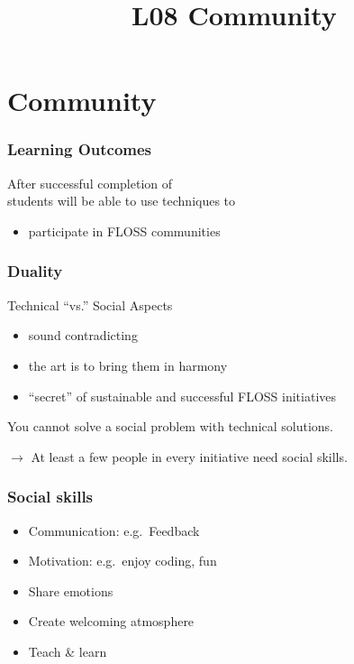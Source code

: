 

\title{L08 Community}




\section{Community}


\begin{frame}
	\frametitle{Learning Outcomes}
	After successful completion of \inserttitle \\
	students will be able to
	use techniques to

	\begin{itemize}
	\item participate in FLOSS communities
	\end{itemize}
\end{frame}

\begin{frame}
	\frametitle{Duality}
	Technical ``vs.'' Social Aspects

	\begin{itemize}[<+-| alert@+>]
		\item sound contradicting
		\item the art is to bring them in harmony
		\item ``secret'' of sustainable and successful FLOSS initiatives
	\end{itemize}
	\vspace{1em}
	\pause[\thebeamerpauses]  %

	You cannot solve a social problem with technical solutions.
	\vspace{1em}
	\pause

	$\rightarrow$ At least a few people in every initiative need social skills.
\end{frame}

\begin{frame}
	\frametitle{Social skills}

	\begin{itemize}[<+-| alert@+>]
		\item Communication: e.g.\ Feedback
		\item Motivation: e.g.\ enjoy coding, fun
		\item Share emotions
		\item Create welcoming atmosphere
		\item Teach \& learn
	\end{itemize}
\end{frame}

